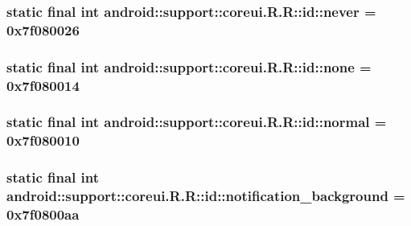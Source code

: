 \hypertarget{classandroid_1_1support_1_1coreui_1_1_r_1_1id_f4a905bfa1aa1c14eb6dc48ff39ac80c}{
\subsubsection[{never}]{\setlength{\rightskip}{0pt plus 5cm}static final int android::support::coreui.R.R::id::never = 0x7f080026}}
\label{classandroid_1_1support_1_1coreui_1_1_r_1_1id_f4a905bfa1aa1c14eb6dc48ff39ac80c}


\hypertarget{classandroid_1_1support_1_1coreui_1_1_r_1_1id_139b86e3c74d1013b3a0844301529f4c}{
\subsubsection[{none}]{\setlength{\rightskip}{0pt plus 5cm}static final int android::support::coreui.R.R::id::none = 0x7f080014}}
\label{classandroid_1_1support_1_1coreui_1_1_r_1_1id_139b86e3c74d1013b3a0844301529f4c}


\hypertarget{classandroid_1_1support_1_1coreui_1_1_r_1_1id_1cfcabb10ce7eba0139f231687c8d876}{
\subsubsection[{normal}]{\setlength{\rightskip}{0pt plus 5cm}static final int android::support::coreui.R.R::id::normal = 0x7f080010}}
\label{classandroid_1_1support_1_1coreui_1_1_r_1_1id_1cfcabb10ce7eba0139f231687c8d876}


\hypertarget{classandroid_1_1support_1_1coreui_1_1_r_1_1id_e1c628b3f01a478de0dc94d4d5d069d9}{
\subsubsection[{notification\_\-background}]{\setlength{\rightskip}{0pt plus 5cm}static final int android::support::coreui.R.R::id::notification\_\-background = 0x7f0800aa}}
\label{classandroid_1_1support_1_1coreui_1_1_r_1_1id_e1c628b3f01a478de0dc94d4d5d069d9}


